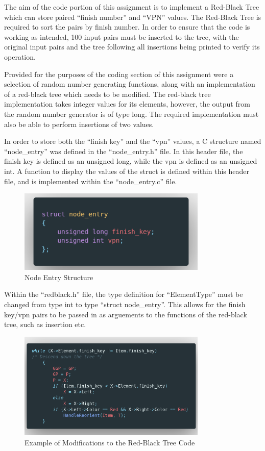 The aim of the code portion of this assignment is to implement a Red-Black Tree
which can store paired ``finish number'' and ``VPN'' values. The Red-Black Tree
is required to sort the pairs by finish number. In order to ensure that the code
is working as intended, 100 input pairs must be inserted to the tree, with the
original input pairs and the tree following all insertions being printed to
verify its operation.

Provided for the purposes of the coding section of this assignment were a
selection of random number generating functions, along with an implementation of
a red-black tree\cite{zentut} which needs to be modified. The red-black tree
implementation
takes integer values for its elements, however, the output from the random
number generator is of type long. The required implementation must also be able
to perform insertions of two values.

In order to store both the ``finish key'' and the ``vpn'' values, a C structure
named ``node\_entry'' was defined in the ``node\_entry.h'' file. In this header
file, the finish key is defined as an unsigned long, while the vpn is defined as
an unsigned int. A function to display the values of the struct is defined
within this header file, and is implemented within the ``node\_entry.c'' file.

\begin{figure}[H]
	\centering
	\includegraphics[width=0.8\textwidth]{images/nodeEntry}
	\caption{Node Entry Structure}
	\label{fig:images-nodeEntry}
\end{figure}

Within the ``redblack.h'' file, the type definition for ``ElementType'' must be
changed from type int to type ``struct node\_entry''. This allows for the finish
key/vpn pairs to be passed in as arguements to the functions of the red-black
tree, such as insertion etc.

\begin{figure}[H]
	\centering
	\includegraphics[width=0.8\textwidth]{images/example}
	\caption{Example of Modifications to the Red-Black Tree Code}
	\label{fig:images-ex}
\end{figure}

